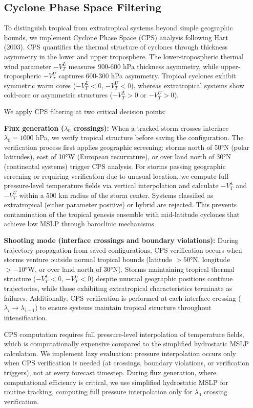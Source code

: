 \documentclass[11pt]{article}
\begin{document}
\subsection{Cyclone Phase Space Filtering}

To distinguish tropical from extratropical systems beyond simple geographic bounds, we implement Cyclone Phase Space (CPS) analysis following Hart (2003). CPS quantifies the thermal structure of cyclones through thickness asymmetry in the lower and upper troposphere. The lower-tropospheric thermal wind parameter $-V_T^L$ measures 900-600 hPa thickness asymmetry, while upper-tropospheric $-V_T^U$ captures 600-300 hPa asymmetry. Tropical cyclones exhibit symmetric warm cores ($-V_T^L < 0$, $-V_T^U < 0$), whereas extratropical systems show cold-core or asymmetric structures ($-V_T^L > 0$ or $-V_T^U > 0$).

We apply CPS filtering at two critical decision points:

\textbf{Flux generation ($\lambda_0$ crossings):} When a tracked storm crosses interface $\lambda_0 = 1000$ hPa, we verify tropical structure before saving the configuration. The verification process first applies geographic screening: storms north of 50°N (polar latitudes), east of 10°W (European recurvature), or over land north of 30°N (continental systems) trigger CPS analysis. For storms passing geographic screening or requiring verification due to unusual location, we compute full pressure-level temperature fields via vertical interpolation and calculate $-V_T^L$ and $-V_T^U$ within a 500 km radius of the storm center. Systems classified as extratropical (either parameter positive) or hybrid are rejected. This prevents contamination of the tropical genesis ensemble with mid-latitude cyclones that achieve low MSLP through baroclinic mechanisms.

\textbf{Shooting mode (interface crossings and boundary violations):} During trajectory propagation from saved configurations, CPS verification occurs when storms venture outside normal tropical bounds (latitude $> 50°$N, longitude $> -10°$W, or over land north of 30°N). Storms maintaining tropical thermal structure ($-V_T^L < 0$, $-V_T^U < 0$) despite unusual geographic positions continue trajectories, while those exhibiting extratropical characteristics terminate as failures. Additionally, CPS verification is performed at each interface crossing ($\lambda_i \to \lambda_{i+1}$) to ensure systems maintain tropical structure throughout intensification.

CPS computation requires full pressure-level interpolation of temperature fields, which is computationally expensive compared to the simplified hydrostatic MSLP calculation. We implement lazy evaluation: pressure interpolation occurs only when CPS verification is needed (at crossings, boundary violations, or verification triggers), not at every forecast timestep. During flux generation, where computational efficiency is critical, we use simplified hydrostatic MSLP for routine tracking, computing full pressure interpolation only for $\lambda_0$ crossing verification.
\end{document}
